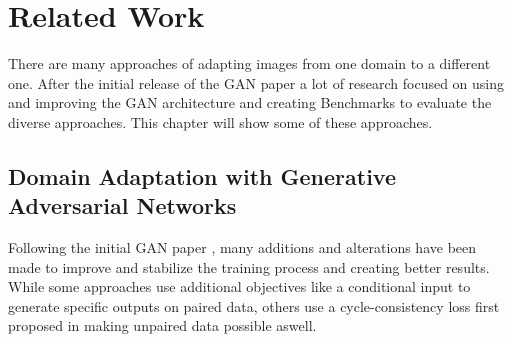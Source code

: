 \chapter{Related Work}
\label{sec:related_work}

There are many approaches of adapting images from one domain to a different one. After the initial release of the GAN paper \cite{NIPS2014_5423} a lot of research focused on using and improving the GAN architecture and creating Benchmarks to evaluate the diverse approaches. This chapter will show some of these approaches.

\section{Domain Adaptation with Generative Adversarial Networks}
Following the initial GAN paper \cite{NIPS2014_5423}, many additions and alterations have been made to improve and stabilize the training process and creating better results. While some approaches use additional objectives like a conditional input to generate specific outputs \cite{DBLP:journals/corr/IsolaZZE16} on paired data, others use a cycle-consistency loss first proposed in \cite{DBLP:journals/corr/ZhuPIE17} making unpaired data possible aswell. 

